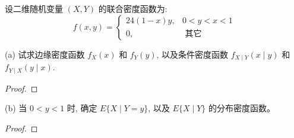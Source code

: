 \documentclass[a4,10pt]{ctexart}
\begin{document}
    \begin{ti}{4}{}

    设二维随机变量 $(X, Y)$ 的联合密度函数为:
    \begin{equation}
    f(x, y)=\left\{\begin{array}{lc}
    24(1-x) y, & 0<y<x<1 \\
    0, & \text { 其它 }
    \end{array}\right.
   \end{equation}
    
    (a) 试求边缘密度函数 $f_X(x)$ 和 $f_Y(y)$, 以及条件密度函数 $f_{X \mid Y}(x \mid y)$ 和 $f_{Y \mid X}(y \mid x)$.
    
    \begin{proof}
    \end{proof}
    
    (b) 当 $0<y<1$ 时, 确定 $E\{X \mid Y=y\}$, 以及 $E\{X \mid Y\}$ 的分布密度函数。
    
    \begin{proof}
    \end{proof}
    \end{ti}
    






              

              

        
\end{document}
